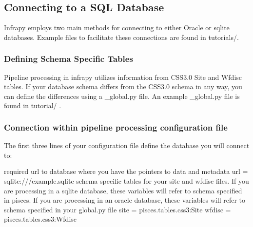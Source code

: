 \documentclass[letterpaper,10pt,english]{sphinxmanual}
\begin{document}
\begin{sphinxVerbatim}[commandchars=\\\{\}]
     
\end{sphinxVerbatim}


\subsection{Connecting to a SQL Database}
\label{\detokenize{pisces:connecting-to-a-sql-database}}
Infrapy employs two main methods for connecting to either Oracle or sqlite databases.  Example files to facilitate these connections are found in tutorials/.


\subsubsection{Defining Schema Specific Tables}
\label{\detokenize{pisces:defining-schema-specific-tables}}
Pipeline processing in infrapy utilizes information from CSS3.0 Site and Wfdisc tables.  If your database schema differs from the CSS3.0 schema in any way, you can define the differences using a \_global.py file.  An example \_global.py file is found in tutorial/ .


\subsubsection{Connection within pipeline processing configuration file}
\label{\detokenize{pisces:connection-within-pipeline-processing-configuration-file}}
The first three lines of your configuration file define the database you will connect to:


\begin{sphinxVerbatim}[commandchars=\\\{\}]
[database] \PYGZsh{} required
\PYGZsh{} url to database where you have the pointers to data and metadata
url = sqlite:///example.sqlite
\PYGZsh{} schema specific tables for your site and wfdisc files.  If you are processing in a sqlite database, these variables will refer to schema specified in pisces. If you are processing in an oracle database, these variables will refer to schema specified in your global\PYGZus{}.py file
site = pisces.tables.css3:Site
wfdisc = pisces.tables.css3:Wfdisc
\end{sphinxVerbatim}
\end{document}
